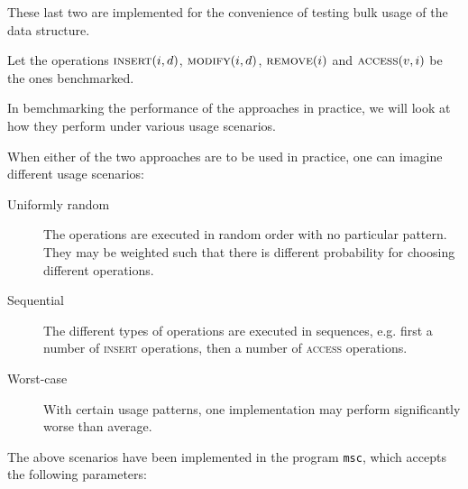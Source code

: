 These last two are implemented for the convenience of testing bulk usage of the
data structure.

Let the operations $\textsc{insert}(i,d)$, $\textsc{modify}(i,d)$,
$\textsc{remove}(i)$ and $\textsc{access}(v,i)$ be the ones benchmarked.

In bemchmarking the performance of the approaches in practice, we will look at
how they perform under various usage scenarios.

When either of the two approaches are to be used in practice, one can imagine
different usage scenarios:

\begin{description}

  \item[Uniformly random] The operations are executed in random order with no
  particular pattern. They may be weighted such that there is different
  probability for choosing different operations.

  \item[Sequential] The different types of operations are executed in sequences,
  e.g. first a number of \textsc{insert} operations, then a number of
  \textsc{access} operations.

  \item[Worst-case] With certain usage patterns, one implementation may perform
  significantly worse than average.

\end{description}

The above scenarios have been implemented in the program \texttt{msc}, which
accepts the following parameters:

